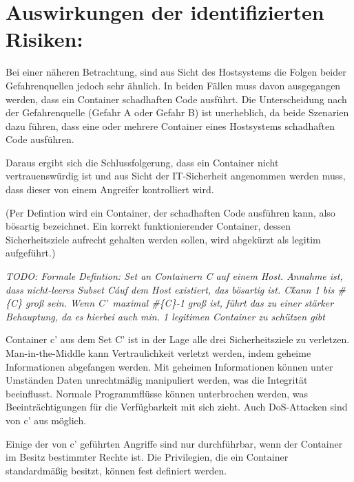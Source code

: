 \documentclass[../main.tex]{subfiles}
\begin{document}
  \section{Auswirkungen der identifizierten Risiken:}
    Bei einer näheren Betrachtung, sind aus Sicht des Hostsystems die Folgen beider Gefahrenquellen jedoch sehr ähnlich. In beiden Fällen muss davon ausgegangen werden, dass ein Container schadhaften Code ausführt. Die Unterscheidung nach der Gefahrenquelle (Gefahr A oder Gefahr B) ist unerheblich, da beide Szenarien dazu führen, dass eine oder mehrere Container eines Hostsystems schadhaften Code ausführen.

    Daraus ergibt sich die Schlussfolgerung, dass ein Container nicht vertrauenswürdig ist und aus Sicht der IT-Sicherheit angenommen werden muss, dass dieser von einem Angreifer kontrolliert wird.


    (Per Defintion wird ein Container, der schadhaften Code ausführen kann, also bösartig bezeichnet. Ein korrekt funktionierender Container, dessen Sicherheitsziele aufrecht gehalten werden sollen, wird abgekürzt als legitim aufgeführt.)

    \emph{TODO: Formale Defintion: Set an Containern C auf einem Host. Annahme ist, dass nicht-leeres Subset C\' auf dem Host existiert, das bösartig ist. C\' kann 1 bis \#\{C\} groß sein. Wenn C'\ maximal \#\{C\}-1 groß ist, führt das zu einer stärker Behauptung, da es hierbei auch min. 1 legitimen Container zu schützen gibt}

    Container c' aus dem Set C' ist in der Lage alle drei Sicherheitsziele zu verletzen. Man-in-the-Middle kann Vertraulichkeit verletzt werden, indem geheime Informationen abgefangen werden. Mit geheimen Informationen können unter Umständen Daten unrechtmäßig manipuliert werden, was die Integrität beeinflusst. Normale Programmflüsse können unterbrochen werden, was Beeinträchtigungen für die Verfügbarkeit mit sich zieht. Auch DoS-Attacken sind von c' aus möglich.

    Einige der von c' geführten Angriffe sind nur durchführbar, wenn der Container im Besitz bestimmter Rechte ist. Die Privilegien, die ein Container standardmäßig besitzt, können fest definiert werden.
\end{document}
